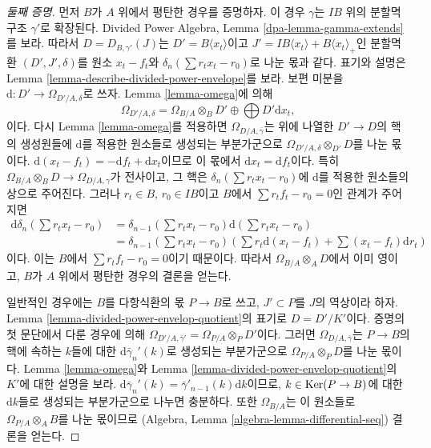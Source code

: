 \begin{proof}[둘째 증명]
먼저 $B$가 $A$ 위에서 평탄한 경우를 증명하자. 이 경우
$\gamma$는 $IB$ 위의 분할멱 구조 $\gamma'$로 확장된다.
Divided Power Algebra, Lemma \ref{dpa-lemma-gamma-extends}를 보라.
따라서 $D = D_{B, \gamma'}(J)$는 $D' =  B\langle x_t \rangle$이고
$J' = IB\langle x_t \rangle + B\langle x_t \rangle_{+}$인 분할멱환
$(D', J', \delta)$를 원소 $x_t - f_t$와
$\delta_n(\sum r_t x_t - r_0)$로 나눈 몫과 같다.
표기와 설명은 Lemma \ref{lemma-describe-divided-power-envelope}를 보라.
보편 미분을 $\text{d} : D' \to \Omega_{D'/A, \delta}$로 쓰자.
Lemma \ref{lemma-omega}에 의해
$$
\Omega_{D'/A, \delta} =
\Omega_{B/A} \otimes_B D' \oplus \bigoplus D' \text{d}x_t,
$$
이다. 다시 Lemma \ref{lemma-omega}를 적용하면
$\Omega_{D/A, \bar\gamma}$는 위에 나열한 $D' \to D$의 핵의
생성원들에 $\text{d}$를 적용한 원소들로 생성되는 부분가군으로
$\Omega_{D'/A, \delta} \otimes_{D'} D$를 나눈 몫이다.
$\text{d}(x_t - f_t) = - \text{d}f_t + \text{d}x_t$이므로
이 몫에서 $\text{d}x_t = \text{d}f_t$이다. 특히
$\Omega_{B/A} \otimes_B D \to \Omega_{D/A, \gamma}$가 전사이고,
그 핵은 $\delta_n(\sum r_t x_t - r_0)$에 $\text{d}$를 적용한
원소들의 상으로 주어진다. 그러나 $r_t \in B$, $r_0 \in IB$이고
$B$에서 $\sum r_tf_t - r_0 = 0$인 관계가 주어지면
\begin{align*}
\text{d}\delta_n(\sum r_t x_t - r_0)
& =
\delta_{n - 1}(\sum r_t x_t - r_0)\text{d}(\sum r_t x_t - r_0)
\\
& =
\delta_{n - 1}(\sum r_t x_t - r_0)
\left(
\sum r_t\text{d}(x_t - f_t) + \sum (x_t - f_t)\text{d}r_t
\right)
\end{align*}
이다. 이는 $B$에서 $\sum r_tf_t - r_0 = 0$이기 때문이다. 따라서
$\Omega_{B/A} \otimes_A D$에서 이미 영이고, $B$가 $A$ 위에서
평탄한 경우의 결론을 얻는다.

\medskip\noindent
일반적인 경우에는 $B$를 다항식환의 몫 $P \to B$로 쓰고,
$J' \subset P$를 $J$의 역상이라 하자.
Lemma \ref{lemma-divided-power-envelop-quotient}의 표기로
$D = D'/K'$이다. 증명의 첫 문단에서 다룬 경우에 의해
$\Omega_{D'/A, \bar\gamma'} = \Omega_{P/A} \otimes_P D'$이다.
그러면 $\Omega_{D/A, \bar \gamma}$는 $P \to B$의 핵에 속하는
$k$들에 대한 $\text{d}\bar\gamma_n'(k)$로 생성되는 부분가군으로
$\Omega_{P/A} \otimes_P D$를 나눈 몫이다. Lemma \ref{lemma-omega}와
Lemma \ref{lemma-divided-power-envelop-quotient}의 $K'$에 대한 설명을 보라.
$\text{d}\bar\gamma_n'(k) = \bar\gamma'_{n - 1}(k)\text{d}k$이므로,
$k \in \mathop{\mathrm{Ker}}(P \to B)$에 대한 $\text{d}k$들로 생성되는 부분가군으로
나누면 충분하다. 또한
$\Omega_{B/A}$는 이 원소들로 $\Omega_{P/A} \otimes_A B$를 나눈 몫이므로
(Algebra, Lemma \ref{algebra-lemma-differential-seq}) 결론을 얻는다.
\end{proof}

